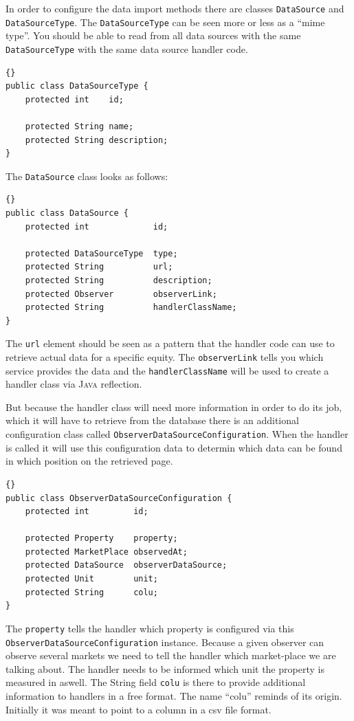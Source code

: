 \documentclass[a4paper,fleqn]{article}
\newcommand{\name}[1]{\textsc{#1}}
\newcommand{\Java}{\name{Java}}
\begin{document}
In order to configure the data import methods there are classes
\lstinline!DataSource! and \lstinline!DataSourceType!. The
\lstinline!DataSourceType! can be seen more or less as a ``mime
type''. You should be able to read from all data sources with the same
\lstinline!DataSourceType! with the same data source handler code.
\begin{lstlisting}[frame=trbl]{}
public class DataSourceType {
	protected int    id;

	protected String name;
	protected String description;
}
\end{lstlisting}
The \lstinline!DataSource! class looks as follows:
\begin{lstlisting}[frame=trbl]{}
public class DataSource {
	protected int             id;

	protected DataSourceType  type;
	protected String          url;
	protected String          description;
	protected Observer        observerLink;
	protected String          handlerClassName;
}
\end{lstlisting}
The \lstinline!url! element should be seen as a pattern that the
handler code can use to retrieve actual data for a specific
equity. The \lstinline!observerLink! tells you which service provides
the data and the \lstinline!handlerClassName! will be used to create a
handler class via \Java{} reflection.

But because the handler class will need more information in order to
do its job, which it will have to retrieve from the database there is
an additional configuration class called
\lstinline!ObserverDataSourceConfiguration!. When the handler is
called it will use this configuration data to determin which data can
be found in which position on the retrieved page.
\begin{lstlisting}[frame=trbl]{}
public class ObserverDataSourceConfiguration {
	protected int         id;

	protected Property    property;
	protected MarketPlace observedAt;
	protected DataSource  observerDataSource;
	protected Unit        unit;
	protected String      colu;
}
\end{lstlisting}
The \lstinline!property! tells the handler which property is
configured via this \lstinline!ObserverDataSourceConfiguration!
instance. Because a given observer can observe several markets we need
to tell the handler which market-place we are talking about. The
handler needs to be informed which unit the property is measured in
aswell. The String field \lstinline!colu! is there to
provide additional information to handlers in a free format. The name
``colu'' reminds of its origin. Initially it was meant to point to
a column in a csv file format.
\end{document}
